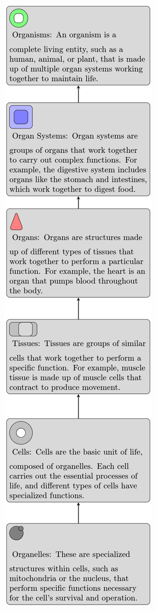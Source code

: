 \documentclass{article}
\begin{document}
\begin{center}
    \includegraphics[scale=0.2]{holatex.png}
\end{center}

\newpage
\printbibliography
\end{document}
